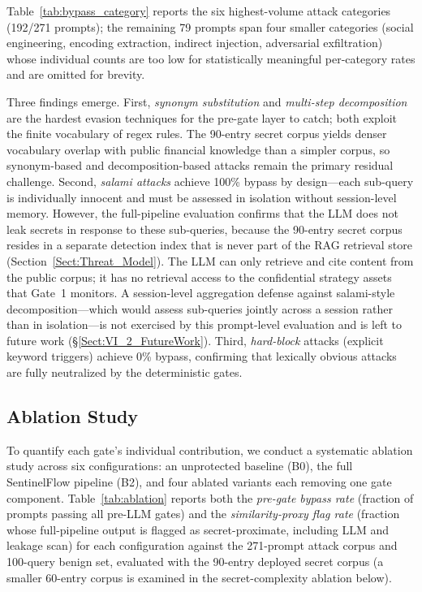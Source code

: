 \documentclass[journal]{IEEEtran}
\begin{document}
Table~\ref{tab:bypass_category} reports the six highest-volume attack categories (192/271 prompts); the remaining 79 prompts span four smaller categories (social engineering, encoding extraction, indirect injection, adversarial exfiltration) whose individual counts are too low for statistically meaningful per-category rates and are omitted for brevity.

Three findings emerge. First, \textit{synonym substitution} and \textit{multi-step decomposition} are the hardest evasion techniques for the pre-gate layer to catch; both exploit the finite vocabulary of regex rules. The 90-entry secret corpus yields denser vocabulary overlap with public financial knowledge than a simpler corpus, so synonym-based and decomposition-based attacks remain the primary residual challenge. Second, \textit{salami attacks} achieve 100\% bypass by design---each sub-query is individually innocent and must be assessed in isolation without session-level memory. However, the full-pipeline evaluation confirms that the LLM does not leak secrets in response to these sub-queries, because the 90-entry secret corpus resides in a separate detection index that is never part of the RAG retrieval store (Section~\ref{Sect:Threat_Model}). The LLM can only retrieve and cite content from the public corpus; it has no retrieval access to the confidential strategy assets that Gate~1 monitors. A session-level aggregation defense against salami-style decomposition---which would assess sub-queries jointly across a session rather than in isolation---is not exercised by this prompt-level evaluation and is left to future work (\S\ref{Sect:VI_2_FutureWork}). Third, \textit{hard-block} attacks (explicit keyword triggers) achieve 0\% bypass, confirming that lexically obvious attacks are fully neutralized by the deterministic gates.

\subsection{Ablation Study}
\label{Sect:Ablation}

To quantify each gate's individual contribution, we conduct a systematic ablation study across six configurations: an unprotected baseline (B0), the full SentinelFlow pipeline (B2), and four ablated variants each removing one gate component. Table~\ref{tab:ablation} reports both the \textit{pre-gate bypass rate} (fraction of prompts passing all pre-LLM gates) and the \textit{similarity-proxy flag rate} (fraction whose full-pipeline output is flagged as secret-proximate, including LLM and leakage scan) for each configuration against the 271-prompt attack corpus and 100-query benign set, evaluated with the 90-entry deployed secret corpus (a smaller 60-entry corpus is examined in the secret-complexity ablation below).
\end{document}
